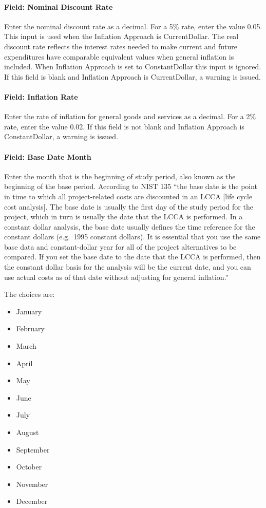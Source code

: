 \paragraph{Field: Nominal Discount Rate}\label{field-nominal-discount-rate}

Enter the nominal discount rate as a decimal. For a 5\% rate, enter the value 0.05. This input is used when the Inflation Approach is CurrentDollar. The real discount rate reflects the interest rates needed to make current and future expenditures have comparable equivalent values when general inflation is included. When Inflation Approach is set to ConstantDollar this input is ignored. If this field is blank and Inflation Approach is CurrentDollar, a warning is issued.

\paragraph{Field: Inflation Rate}\label{field-inflation-rate}

Enter the rate of inflation for general goods and services as a decimal. For a 2\% rate, enter the value 0.02. If this field is not blank and Inflation Approach is ConstantDollar, a warning is issued.

\paragraph{Field: Base Date Month}\label{field-base-date-month}

Enter the month that is the beginning of study period, also known as the beginning of the base period. According to NIST 135 ``the base date is the point in time to which all project-related costs are discounted in an LCCA {[}life cycle cost analysis{]}. The base date is usually the first day of the study period for the project, which in turn is usually the date that the LCCA is performed. In a constant dollar analysis, the base date usually defines the time reference for the constant dollars (e.g.~1995 constant dollars). It is essential that you use the same base data and constant-dollar year for all of the project alternatives to be compared. If you set the base date to the date that the LCCA is performed, then the constant dollar basis for the analysis will be the current date, and you can use actual costs as of that date without adjusting for general inflation.''

The choices are:

\begin{itemize}
\item
  January
\item
  February
\item
  March
\item
  April
\item
  May
\item
  June
\item
  July
\item
  August
\item
  September
\item
  October
\item
  November
\item
  December
\end{itemize}

